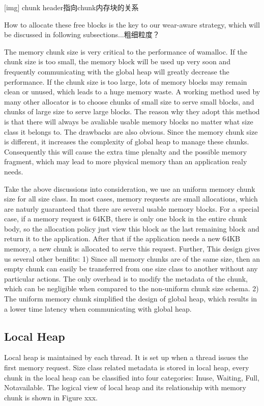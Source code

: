 \documentclass{vldb}
\begin{document}
[img] chunk header指向chunk内存块的关系

How to allocate these free blocks is the key to our wear-aware strategy, which will be discussed in following subsections...粗细粒度？

The memory chunk size is very critical to the performance of wamalloc. 
If the chunk size is too small, the memory block will be used up very soon and frequently communicating with the global heap will greatly decrease the performance.
If the chunk size is too large, lots of memory blocks may remain clean or unused, which leads to a huge memory waste. 
A working method used by many other allocator is to choose chunks of small size to serve small blocks, and chunks of large size to serve large blocks.
The reason why they adopt this method is that there will always be avaliable usable memory blocks no matter what size class it belongs to.
The drawbacks are also obvious.
Since the memory chunk size is different, it increases the complexity of global heap to manage these chunks.
Consequently this will cause the extra time plenalty and the possible memory fragment, which may lead to more physical memory than an application realy needs.

Take the above discussions into consideration, we use an uniform memory chunk size for all size class. 
In most cases, memory requests are small allocations, which are naturly guaranteed that there are several usable memory blocks. 
For a special case, if a memory request is 64KB, there is only one block in the entire chunk body, so the allocation policy just view this block as the last remaining block and return it to the application. After that if the application needs a new 64KB memory, a new chunk is allocated to serve this request.
Further, This design gives us several other benifits: 
1) Since all memory chunks are of the same size, then an empty chunk can easily be transferred from one size class to another without any particular actions.
The only overhead is to modify the metadata of the chunk, which can be negligible when compared to the non-uniform chunk size schema. 
2) The uniform memory chunk simplified the design of global heap, which results in a lower time latency when communicating with global heap.

\subsection{Local Heap}

Local heap is maintained by each thread. 
It is set up when a thread issues the first memory request.
Size class related metadata is stored in local heap, every chunk in the local heap can be classified into four categories: Inuse, Waiting, Full, Notavailable. 
The logical view of local heap and its relationship with memory chunk is shown in Figure xxx.
\end{document}
